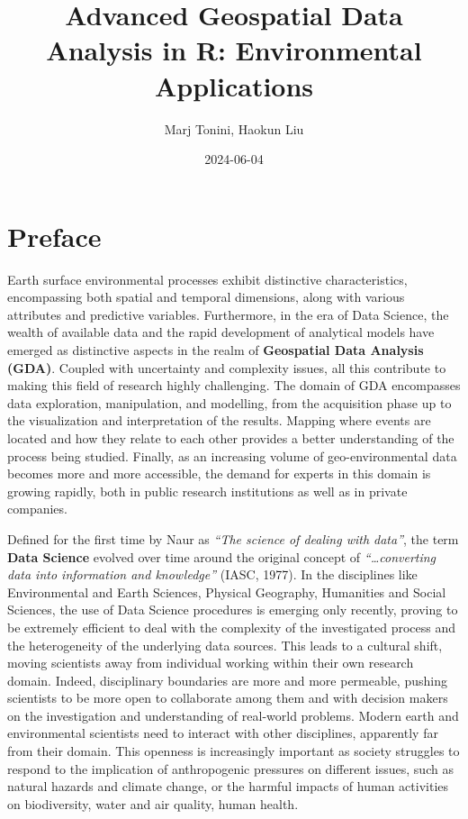 \documentclass[
]{book}
\title{Advanced Geospatial Data Analysis in R: Environmental Applications}
\author{Marj Tonini, Haokun Liu}
\date{2024-06-04}
\begin{document}
\maketitle

{
\setcounter{tocdepth}{1}
\tableofcontents
}
\hypertarget{preface}{%
\chapter*{Preface}\label{preface}}

Earth surface environmental processes exhibit distinctive characteristics, encompassing both spatial and temporal dimensions, along with various attributes and predictive variables.
Furthermore, in the era of Data Science, the wealth of available data and the rapid development of analytical models have emerged as distinctive aspects in the realm of \textbf{Geospatial Data Analysis (GDA)}.
Coupled with uncertainty and complexity issues, all this contribute to making this field of research highly challenging.
The domain of GDA encompasses data exploration, manipulation, and modelling, from the acquisition phase up to the visualization and interpretation of the results.
Mapping where events are located and how they relate to each other provides a better understanding of the process being studied.
Finally, as an increasing volume of geo-environmental data becomes more and more accessible, the demand for experts in this domain is growing rapidly, both in public research institutions as well as in private companies.

Defined for the first time by Naur as \emph{``The science of dealing with data''}, the term \textbf{Data Science} evolved over time around the original concept of \emph{``\ldots converting data into information and knowledge''} (IASC, 1977).
In the disciplines like Environmental and Earth Sciences, Physical Geography, Humanities and Social Sciences, the use of Data Science procedures is emerging only recently, proving to be extremely efficient to deal with the complexity of the investigated process and the heterogeneity of the underlying data sources.
This leads to a cultural shift, moving scientists away from individual working within their own research domain.
Indeed, disciplinary boundaries are more and more permeable, pushing scientists to be more open to collaborate among them and with decision makers on the investigation and understanding of real-world problems.
Modern earth and environmental scientists need to interact with other disciplines, apparently far from their domain.
This openness is increasingly important as society struggles to respond to the implication of anthropogenic pressures on different issues, such as natural hazards and climate change, or the harmful impacts of human activities on biodiversity, water and air quality, human health.
\end{document}
